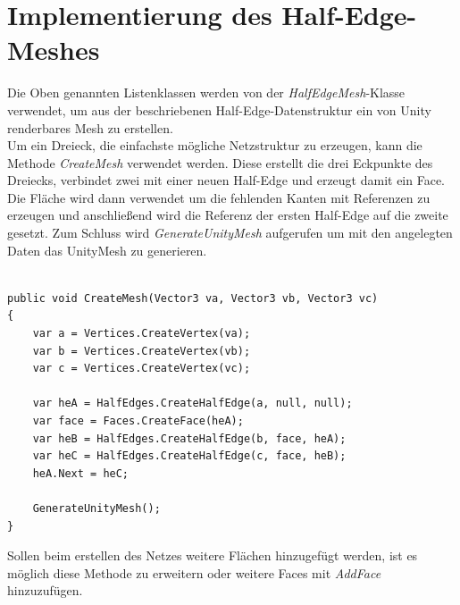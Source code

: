 \section{Implementierung des Half-Edge-Meshes}
Die Oben genannten Listenklassen werden von der \textit{HalfEdgeMesh}-Klasse verwendet, um aus der beschriebenen Half-Edge-Datenstruktur ein von Unity renderbares Mesh zu erstellen. 
\\
Um ein Dreieck, die einfachste m\"ogliche Netzstruktur zu erzeugen, kann die Methode \textit{CreateMesh} verwendet werden. Diese erstellt die drei Eckpunkte des Dreiecks, verbindet zwei mit einer neuen Half-Edge und erzeugt damit ein Face. Die Fl\"ache wird dann verwendet um die fehlenden Kanten mit Referenzen zu erzeugen und anschlie{\ss}end wird die Referenz der ersten Half-Edge auf die zweite gesetzt. Zum Schluss wird \textit{GenerateUnityMesh} aufgerufen um mit den angelegten Daten das UnityMesh zu generieren.
\begin{lstlisting}

public void CreateMesh(Vector3 va, Vector3 vb, Vector3 vc)
{
	var a = Vertices.CreateVertex(va);
	var b = Vertices.CreateVertex(vb);
	var c = Vertices.CreateVertex(vc);

	var heA = HalfEdges.CreateHalfEdge(a, null, null);
	var face = Faces.CreateFace(heA);
	var heB = HalfEdges.CreateHalfEdge(b, face, heA);
	var heC = HalfEdges.CreateHalfEdge(c, face, heB);
	heA.Next = heC;

	GenerateUnityMesh();
}

\end{lstlisting}
Sollen beim erstellen des Netzes weitere Fl\"achen hinzugef\"ugt werden, ist es m\"oglich diese Methode zu erweitern oder weitere Faces mit \textit{AddFace} hinzuzuf\"ugen.

